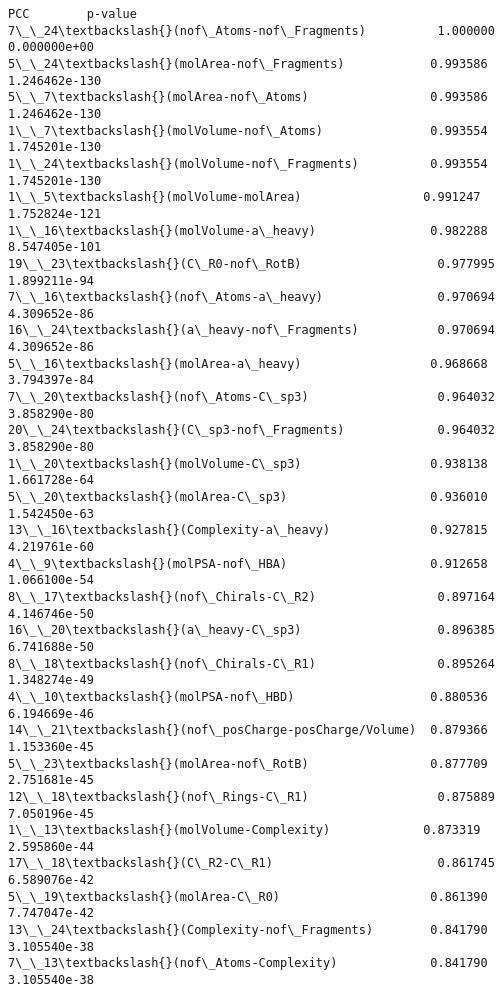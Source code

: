 \documentclass[11pt]{article}
\begin{document}
    \begin{Verbatim}[commandchars=\\\{\}]
                                              PCC        p-value
7\_\_24\textbackslash{}(nof\_Atoms-nof\_Fragments)          1.000000   0.000000e+00
5\_\_24\textbackslash{}(molArea-nof\_Fragments)            0.993586  1.246462e-130
5\_\_7\textbackslash{}(molArea-nof\_Atoms)                 0.993586  1.246462e-130
1\_\_7\textbackslash{}(molVolume-nof\_Atoms)               0.993554  1.745201e-130
1\_\_24\textbackslash{}(molVolume-nof\_Fragments)          0.993554  1.745201e-130
1\_\_5\textbackslash{}(molVolume-molArea)                 0.991247  1.752824e-121
1\_\_16\textbackslash{}(molVolume-a\_heavy)                0.982288  8.547405e-101
19\_\_23\textbackslash{}(C\_R0-nof\_RotB)                   0.977995   1.899211e-94
7\_\_16\textbackslash{}(nof\_Atoms-a\_heavy)                0.970694   4.309652e-86
16\_\_24\textbackslash{}(a\_heavy-nof\_Fragments)           0.970694   4.309652e-86
5\_\_16\textbackslash{}(molArea-a\_heavy)                  0.968668   3.794397e-84
7\_\_20\textbackslash{}(nof\_Atoms-C\_sp3)                  0.964032   3.858290e-80
20\_\_24\textbackslash{}(C\_sp3-nof\_Fragments)             0.964032   3.858290e-80
1\_\_20\textbackslash{}(molVolume-C\_sp3)                  0.938138   1.661728e-64
5\_\_20\textbackslash{}(molArea-C\_sp3)                    0.936010   1.542450e-63
13\_\_16\textbackslash{}(Complexity-a\_heavy)              0.927815   4.219761e-60
4\_\_9\textbackslash{}(molPSA-nof\_HBA)                    0.912658   1.066100e-54
8\_\_17\textbackslash{}(nof\_Chirals-C\_R2)                 0.897164   4.146746e-50
16\_\_20\textbackslash{}(a\_heavy-C\_sp3)                   0.896385   6.741688e-50
8\_\_18\textbackslash{}(nof\_Chirals-C\_R1)                 0.895264   1.348274e-49
4\_\_10\textbackslash{}(molPSA-nof\_HBD)                   0.880536   6.194669e-46
14\_\_21\textbackslash{}(nof\_posCharge-posCharge/Volume)  0.879366   1.153360e-45
5\_\_23\textbackslash{}(molArea-nof\_RotB)                 0.877709   2.751681e-45
12\_\_18\textbackslash{}(nof\_Rings-C\_R1)                  0.875889   7.050196e-45
1\_\_13\textbackslash{}(molVolume-Complexity)             0.873319   2.595860e-44
17\_\_18\textbackslash{}(C\_R2-C\_R1)                       0.861745   6.589076e-42
5\_\_19\textbackslash{}(molArea-C\_R0)                     0.861390   7.747047e-42
13\_\_24\textbackslash{}(Complexity-nof\_Fragments)        0.841790   3.105540e-38
7\_\_13\textbackslash{}(nof\_Atoms-Complexity)             0.841790   3.105540e-38

\end{Verbatim}
\end{document}
